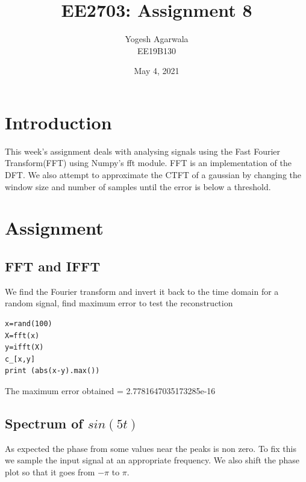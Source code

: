\documentclass{article}
\title{EE2703: Assignment 8}
\author{Yogesh Agarwala \\ EE19B130}
\date{May 4, 2021}
\begin{document}
\maketitle

\section{Introduction}
This week's assignment deals with analysing signals using the Fast Fourier Transform(FFT) using Numpy's fft module. FFT is an implementation of the DFT. We also attempt to approximate the CTFT of a gaussian by changing the window size and number of samples until the error is below a threshold.



\section {Assignment}
\subsection {FFT and IFFT}
We find the Fourier transform and invert it back to the time domain for a random signal, find maximum error to test the reconstruction

\begin{lstlisting}
x=rand(100)
X=fft(x)
y=ifft(X)
c_[x,y]
print (abs(x-y).max())
\end{lstlisting}
The maximum error obtained = 2.7781647035173285e-16



\subsection{Spectrum of $sin(5t)$}
As expected the phase from some values near the peaks is non zero. To fix this we sample the input signal at an appropriate frequency. We also shift the phase plot so that it goes from $-\pi$ to $\pi$.
\end{document}
